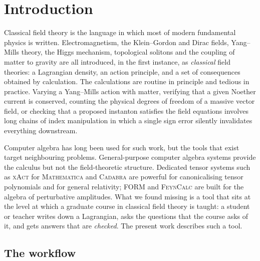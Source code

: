 \section{Introduction}
\label{sec:intro}

Classical field theory is the language in which most of modern fundamental physics is written. Electromagnetism, the Klein--Gordon and Dirac fields, Yang--Mills theory, the Higgs mechanism, topological solitons and the coupling of matter to gravity are all introduced, in the first instance, as \emph{classical} field theories: a Lagrangian density, an action principle, and a set of consequences obtained by calculation. The calculations are routine in principle and tedious in practice. Varying a Yang--Mills action with matter, verifying that a given Noether current is conserved, counting the physical degrees of freedom of a massive vector field, or checking that a proposed instanton satisfies the field equations involves long chains of index manipulation in which a single sign error silently invalidates everything downstream.

Computer algebra has long been used for such work, but the tools that exist target neighbouring problems. General-purpose computer algebra systems provide the calculus but not the field-theoretic structure. Dedicated tensor systems such as \textsc{xAct} for \textsc{Mathematica} and \textsc{Cadabra} \cite{Peeters2007} are powerful for canonicalising tensor polynomials and for general relativity; \textsc{FORM} \cite{Vermaseren2000} and \textsc{FeynCalc} \cite{Mertig1991,Shtabovenko2016} are built for the algebra of perturbative amplitudes. What we found missing is a tool that sits at the level at which a graduate course in classical field theory is taught: a student or teacher writes down a Lagrangian, asks the questions that the course asks of it, and gets answers that are \emph{checked}. The present work describes such a tool.

\subsection{The \fs{} workflow}

